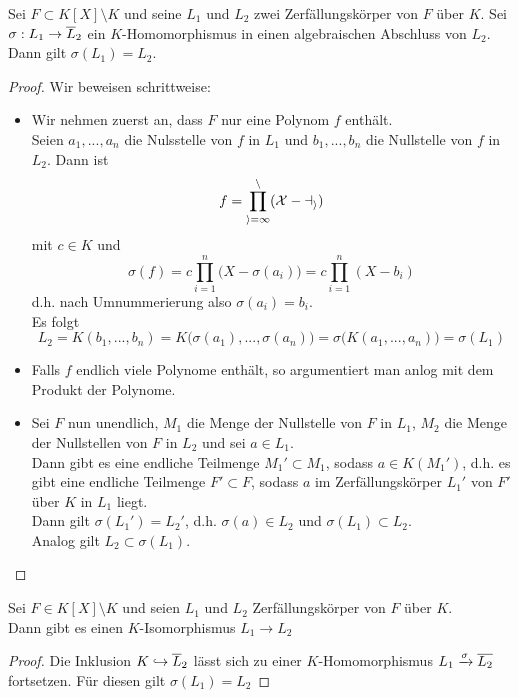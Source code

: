 	\begin{satz}\label{satz:abbZFK}
		Sei $F\subset K[X]\setminus K$ und seine $L_1$ und $L_2$ zwei Zerfällungskörper von $F$ über $K$.
		Sei $\sigma:L_1\to\overline{L}_2$ ein $K$-Homomorphismus in einen algebraischen Abschluss von $L_2$.\\
		Dann gilt $\sigma(L_1)=L_2$.
	\end{satz}
	\begin{proof}
		Wir beweisen schrittweise:
		\begin{itemize}
			\item Wir nehmen zuerst an, dass $F$ nur eine Polynom $f$ enthält.\\
			Seien $a_1,...,a_n$ die Nulsstelle von $f$ in $L_1$ und $b_1,...,b_n$ die Nullstelle von $f$ in $L_2$. Dann ist
			\[f=\cal\prod_{i=1}^{n}(X-a_i)\]
			mit $c\in K$ und
			\[\sigma(f)=c\prod_{i=1}^{n}\big(X-\sigma(a_i)\big)=c\prod_{i=1}^n(X-b_i)\]
			d.h. nach Umnummerierung also $\sigma(a_i)=b_i$.\\
			Es folgt
			\[L_2=K(b_1,...,b_n)=K\big(\sigma(a_1),...,\sigma(a_n)\big)=\sigma\big(K(a_1,...,a_n)\big)=\sigma(L_1)\]
			\item Falls $f$ endlich viele Polynome enthält, so argumentiert man anlog mit dem Produkt der Polynome.
			\item Sei $F$ nun unendlich, $M_1$ die Menge der Nullstelle von $F$ in $L_1$, $M_2$ die Menge der Nullstellen von $F$ in $L_2$ und sei $a\in L_1$.\\
			Dann gibt es eine endliche Teilmenge $M_1'\subset M_1$, sodass $a\in K(M_1')$, d.h. es gibt eine endliche Teilmenge $F'\subset F$, sodass $a$ im Zerfällungskörper $L_1'$ von $F'$ über $K$ in $L_1$ liegt.\\
			Dann gilt $\sigma(L_1')=L_2'$, d.h. $\sigma(a)\in L_2$ und $\sigma(L_1)\subset L_2$.\\
			Analog gilt $L_2\subset\sigma(L_1)$.
		\end{itemize}
	\end{proof}

	\begin{kor}
		Sei $F\in K[X]\setminus K$ und seien $L_1$ und $L_2$ Zerfällungskörper von $F$ über $K$.\\
		Dann gibt es einen $K$-Isomorphismus $L_1\to L_2$
	\end{kor}
	\begin{proof}
		Die Inklusion $K\hookrightarrow \overline{L}_2$ lässt sich zu einer $K$-Homomorphismus $L_1\xrightarrow{\sigma} \overline{L_2}$ fortsetzen. Für diesen gilt $\sigma(L_1)=L_2$
	\end{proof}


